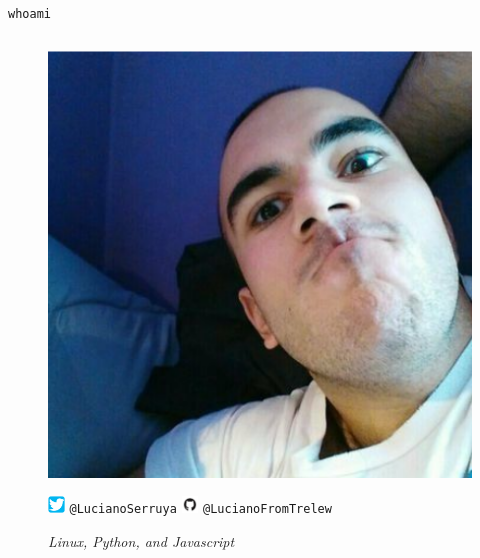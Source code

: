 \documentclass{beamer}
\begin{document}
\begin{frame}[fragile]{\texttt{whoami}}
    \begin{columns}
        \begin{figure}[H]
            \centering
            \includegraphics[width=0.8\linewidth]{profile-luciano.png}
            \caption{\emph{Linux, Python, and Javascript}}
            \includegraphics[height=1.2em]{logo-twitter.png} \texttt{@LucianoSerruya} 
            \linebreak
            \includegraphics[height=1.2em]{logo-github.png} \texttt{@LucianoFromTrelew} 
        \end{figure}


\end{columns}
\end{frame}
\end{document}
